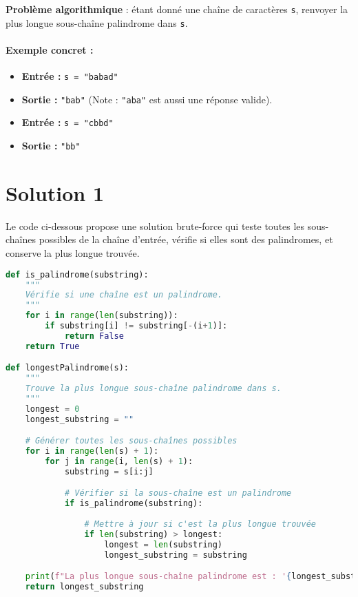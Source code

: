 \documentclass[12pt, a4paper]{article}
\begin{document}
\textbf{Problème algorithmique} : étant donné une chaîne de caractères \texttt{s}, renvoyer la plus longue sous-chaîne palindrome dans \texttt{s}.

\paragraph{Exemple concret :}
\begin{itemize}
    \item \textbf{Entrée :} \texttt{s = "babad"}
    \item \textbf{Sortie :} \texttt{"bab"} (Note : \texttt{"aba"} est aussi une réponse valide).
    \item \textbf{Entrée :} \texttt{s = "cbbd"}
    \item \textbf{Sortie :} \texttt{"bb"}
\end{itemize}


\section*{Solution 1}

Le code ci-dessous propose une solution brute-force qui teste toutes les sous-chaînes possibles de la chaîne d'entrée, vérifie si elles sont des palindromes, et conserve la plus longue trouvée.
\vspace{5mm}
\begin{lstlisting}[language=Python, label={code:palindrome}]
def is_palindrome(substring):
    """
    Vérifie si une chaîne est un palindrome.
    """
    for i in range(len(substring)):
        if substring[i] != substring[-(i+1)]:
            return False
    return True

def longestPalindrome(s):
    """
    Trouve la plus longue sous-chaîne palindrome dans s.
    """
    longest = 0
    longest_substring = ""

    # Générer toutes les sous-chaînes possibles
    for i in range(len(s) + 1):
        for j in range(i, len(s) + 1):
            substring = s[i:j]

            # Vérifier si la sous-chaîne est un palindrome
            if is_palindrome(substring):
                
                # Mettre à jour si c'est la plus longue trouvée
                if len(substring) > longest:
                    longest = len(substring)
                    longest_substring = substring

    print(f"La plus longue sous-chaîne palindrome est : '{longest_substring}'")
    return longest_substring

\end{lstlisting}
\end{document}
